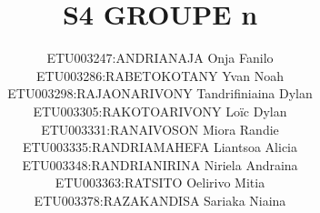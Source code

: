 \documentclass[a4paper,12pt]{article}
\begin{document}
	
\title{\textbf{S4 GROUPE n}}

\author{		
	\begin{tabular}{rl}	
		ETU003247: & ANDRIANAJA Onja Fanilo \\
		ETU003286: & RABETOKOTANY Yvan Noah \\
		ETU003298: & RAJAONARIVONY Tandrifiniaina Dylan \\
		ETU003305: & RAKOTOARIVONY Loïc Dylan \\
		ETU003331: & RANAIVOSON Miora Randie \\
		ETU003335: & RANDRIAMAHEFA Liantsoa Alicia \\
		ETU003348: & RANDRIANIRINA Niriela Andraina \\
		ETU003363: & RATSITO Oelirivo Mitia \\
		ETU003378: & RAZAKANDISA Sariaka Niaina \\
	\end{tabular}
}
\date{}

\maketitle
	
\end{document}

